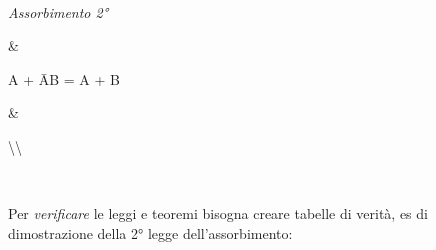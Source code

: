 \begin{longtable}[]
\begin{minipage}[b]{\linewidth}
\end{minipage} \\
\begin{minipage}[b]{\linewidth}\centering
\emph{Assorbimento 2°}
\end{minipage} & \begin{minipage}[b]{\linewidth}\centering
A + ĀB = A + B
\end{minipage} & \begin{minipage}[b]{\linewidth}\centering
\textbackslash\textbackslash{}
\end{minipage} \\
\midrule\noalign{}
\endhead
\bottomrule\noalign{}
\endlastfoot
\end{longtable}

Per \emph{verificare} le leggi e teoremi bisogna creare tabelle di
verità, es di dimostrazione della 2° legge dell'assorbimento:

